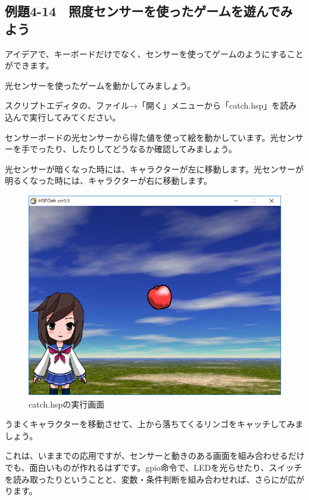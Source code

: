 \newpage
\subsection{例題4-14　照度センサーを使ったゲームを遊んでみよう}

\begin{description}
    \item {}
\end{description}


アイデアで、キーボードだけでなく、センサーを使ってゲームのようにすることができます。

光センサーを使ったゲームを動かしてみましょう。


スクリプトエディタの、ファイル→「開く」メニューから「catch.hsp」を読み込んで実行してみてください。


\begin{description}
    \item {}
\end{description}

センサーボードの光センサーから得た値を使って絵を動かしています。光センサーを手でったり、したりしてどうなるか確認してみましょう。

光センサーが暗くなった時には、キャラクターが左に移動します。光センサーが明るくなった時には、キャラクターが右に移動します。


\begin{figure}[H]
    \begin{center}
      \includegraphics[keepaspectratio,width=11.269cm,height=8.89cm]{text04-img/text04-img041.png}
      \caption{catch.hspの実行画面}
    \end{center}
    \label{fig:prog_menu}
\end{figure}

うまくキャラクターを移動させて、上から落ちてくるリンゴをキャッチしてみましょう。

これは、いままでの応用ですが、センサーと動きのある画面を組み合わせるだけでも、面白いものが作れるはずです。gpio命令で、LEDを光らせたり、スイッチを読み取ったりということと、変数・条件判断を組み合わせれば、さらにが広がります。














